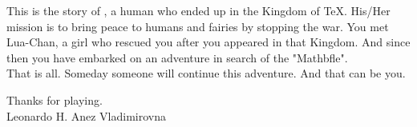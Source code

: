 \documentclass{article}
\begin{document}
This is the story of \name, a human who ended up in the Kingdom of TeX. His/Her mission is to bring peace to humans and fairies by stopping the war.
You met Lua-Chan, a girl who rescued you after you appeared in that Kingdom. And since then you have embarked on an adventure in search of the "Mathbfle".
\\
That is all. Someday someone will continue this adventure. And that can be you.

\begin{center}


Thanks for playing. \\
Leonardo H. Anez Vladimirovna
\end{center}
\end{document}

